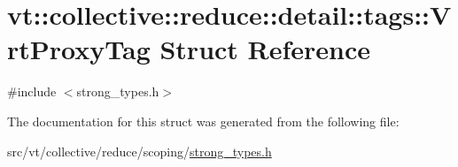 \hypertarget{structvt_1_1collective_1_1reduce_1_1detail_1_1tags_1_1_vrt_proxy_tag}{}\section{vt\+:\+:collective\+:\+:reduce\+:\+:detail\+:\+:tags\+:\+:Vrt\+Proxy\+Tag Struct Reference}
\label{structvt_1_1collective_1_1reduce_1_1detail_1_1tags_1_1_vrt_proxy_tag}


{\ttfamily \#include $<$strong\+\_\+types.\+h$>$}



The documentation for this struct was generated from the following file\+:\begin{DoxyCompactItemize}
\item 
src/vt/collective/reduce/scoping/\hyperlink{strong__types_8h}{strong\+\_\+types.\+h}\end{DoxyCompactItemize}
